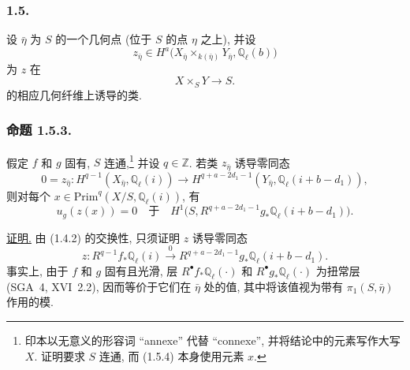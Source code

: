 \subsubsection*{1.5.}
设 $\bar\eta$ 为 $S$ 的一个几何点 (位于 $S$ 的点 $\eta$ 之上), 并设
\begin{equation}\tag{1.5.1}
z_{\bar\eta}\in
H^a\bigl(X_{\bar\eta}\times_{k(\bar\eta)}Y_{\bar\eta},
\mathbb Q_\ell(b)\bigr)
\end{equation}
为 $z$ 在
\begin{equation}\tag{1.5.2}
X\times_S Y\longrightarrow S.
\end{equation}
的相应几何纤维上诱导的类.

\subsubsection*{命题 1.5.3.}
假定 $f$ 和 $g$ 固有, $S$ 连通,\footnote{印本以无意义的形容词 ``annexe'' 代替 ``connexe'', 并将结论中的元素写作大写 $X$. 证明要求 $S$ 连通, 而 (1.5.4) 本身使用元素 $x$.} 并设 $q\in\mathbb Z$. 若类 $z_{\bar\eta}$ 诱导零同态
\begin{equation}\tag{1.5.3}
0=z_{\bar\eta}:H^{q-1}(X_{\bar\eta},\mathbb Q_\ell(i))
\longrightarrow
H^{q+a-2d_1-1}(Y_{\bar\eta},\mathbb Q_\ell(i+b-d_1)),
\end{equation}
则对每个 $x\in\mathrm{Prim}^q(X/S,\mathbb Q_\ell(i))$, 有
\begin{equation}\tag{1.5.4}
u_g(z(x))=0\quad\text{于}\quad
H^1\bigl(S,R^{q+a-2d_1-1}g_*\mathbb Q_\ell(i+b-d_1)\bigr).
\end{equation}

\noindent\underline{证明.}
由 (1.4.2) 的交换性, 只须证明 $z$ 诱导零同态
\begin{equation}\tag{1.5.5}
z:R^{q-1}f_*\mathbb Q_\ell(i)
\stackrel{0}{\longrightarrow}
R^{q+a-2d_1-1}g_*\mathbb Q_\ell(i+b-d_1).
\end{equation}
事实上, 由于 $f$ 和 $g$ 固有且光滑, 层 $R^\bullet f_*\mathbb Q_\ell(\mathord\cdot)$ 和 $R^\bullet g_*\mathbb Q_\ell(\mathord\cdot)$ 为扭常层 (SGA~4, XVI~2.2), 因而等价于它们在 $\bar\eta$ 处的值, 其中将该值视为带有 $\pi_1(S,\bar\eta)$ 作用的模.

